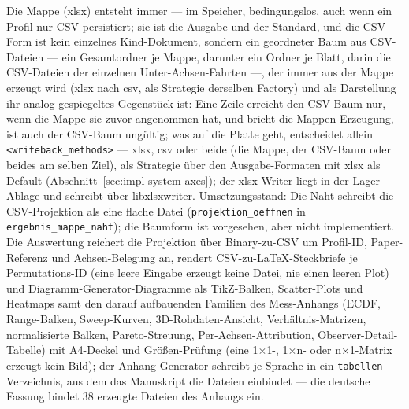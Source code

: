\begin{nurlang}
Die Mappe (xlsx) entsteht immer --- im Speicher, bedingungslos, auch wenn ein Profil nur CSV
persistiert; sie ist die Ausgabe und der Standard, und die CSV-Form ist kein einzelnes Kind-Dokument,
sondern ein geordneter Baum aus CSV-Dateien --- ein Gesamtordner je Mappe, darunter ein Ordner je Blatt,
darin die CSV-Dateien der einzelnen Unter-Achsen-Fahrten ---, der immer aus der Mappe erzeugt wird (xlsx
nach csv, als Strategie derselben Factory) und als Darstellung ihr analog gespiegeltes Gegenstück ist:
Eine Zeile erreicht den CSV-Baum nur, wenn die Mappe sie zuvor
angenommen hat, und bricht die Mappen-Erzeugung, ist auch der CSV-Baum ungültig; was auf die Platte geht,
entscheidet allein \texttt{<writeback\_methods>} --- xlsx, csv oder beide (die Mappe, der CSV-Baum oder
beides am selben Ziel), als Strategie über den
Ausgabe-Formaten mit xlsx als Default (Abschnitt~\ref{sec:impl-system-axes}); der xlsx-Writer liegt in
der Lager-Ablage und schreibt über libxlsxwriter. Umsetzungsstand: Die Naht schreibt die
CSV-Projektion als eine flache Datei (\texttt{projektion\_\allowbreak{}oeffnen} in
\texttt{ergebnis\_\allowbreak{}mappe\_\allowbreak{}naht}); die Baumform ist vorgesehen, aber nicht implementiert. Die
Auswertung reichert die Projektion über
Binary-zu-CSV um Profil-ID, Paper-Referenz und Achsen-Belegung an, rendert CSV-zu-LaTeX-Steckbriefe
je Permutations-ID (eine leere Eingabe erzeugt keine Datei, nie einen leeren Plot) und
Diagramm-Generator-Diagramme als TikZ-Balken, Scatter-Plots und Heatmaps samt den darauf aufbauenden
Familien des Mess-Anhangs (ECDF, Range-Balken, Sweep-Kurven, 3D-Rohdaten-Ansicht, Verhältnis-Matrizen,
normalisierte Balken, Pareto-Streuung, Per-Achsen-Attribution, Observer-Detail-Tabelle) mit A4-Deckel und
Größen-Prüfung (eine 1$\times$1-, 1$\times$n- oder n$\times$1-Matrix erzeugt kein Bild); der
Anhang-Generator schreibt je Sprache in ein \texttt{tabellen}-Verzeichnis, aus dem das Manuskript die
Dateien einbindet --- die deutsche Fassung bindet 38 erzeugte Dateien des Anhangs ein.
\end{nurlang}

